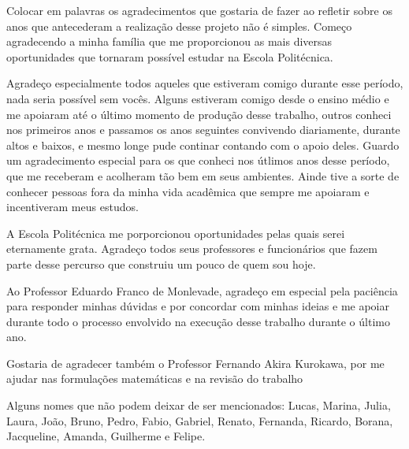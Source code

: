 Colocar em palavras os agradecimentos que gostaria de fazer ao refletir sobre os anos que antecederam a realização desse projeto não é simples. Começo agradecendo a minha família que me proporcionou as mais diversas oportunidades que tornaram possível estudar na Escola Politécnica.

Agradeço especialmente todos aqueles que estiveram comigo durante esse período, nada seria possível sem vocês. Alguns estiveram comigo desde o ensino médio e me apoiaram até o último momento de produção desse trabalho, outros conheci nos primeiros anos e passamos os anos seguintes convivendo diariamente, durante altos e baixos, e mesmo longe pude continar contando com o apoio deles. Guardo um agradecimento especial para os que conheci nos útlimos anos desse período, que me receberam e acolheram tão bem em seus ambientes.
Ainde tive a sorte de conhecer pessoas fora da minha vida acadêmica que sempre me apoiaram e incentiveram meus estudos. 

A Escola Politécnica me porporcionou oportunidades pelas quais serei eternamente grata. Agradeço todos seus professores e funcionários que fazem parte desse percurso que construiu um pouco de quem sou hoje. 

Ao Professor Eduardo Franco de Monlevade, agradeço em especial pela paciência para responder minhas dúvidas e por concordar com minhas ideias e me apoiar durante todo o processo envolvido na execução desse trabalho durante o último ano.

Gostaria de agradecer também o Professor Fernando Akira Kurokawa, por me ajudar nas formulações matemáticas e na revisão  do trabalho

Alguns nomes que não podem deixar de ser mencionados: Lucas, Marina, Julia, Laura, João, Bruno, Pedro, Fabio, Gabriel, Renato, Fernanda, Ricardo, Borana, Jacqueline, Amanda, Guilherme e Felipe.